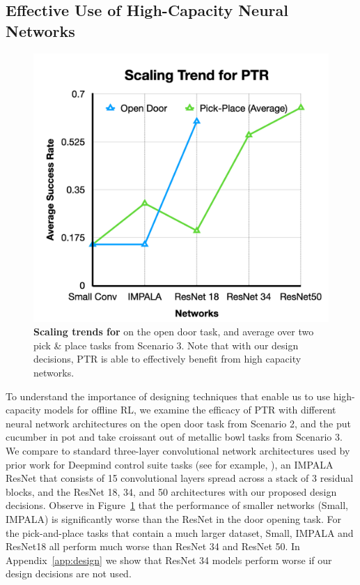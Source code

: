 \subsection{Effective Use of High-Capacity Neural Networks}

\begin{figure}
\centering
\vspace{-0.5cm}
\includegraphics[width=0.98\linewidth]{chapters/ptr/scaling_ptr.pdf}
\vspace{-0.4cm}
\caption{\footnotesize{\label{fig:scaling_ptr} \textbf{Scaling trends for \ptrmethodname} on the open door task, and average over two pick \& place tasks from Scenario 3. Note that with our design decisions, PTR is able to effectively benefit from high capacity networks.}}
\vspace{-0.6cm}
\end{figure}
To understand the importance of designing techniques that enable us to use high-capacity models for offline RL, we examine the efficacy of PTR with different neural network architectures on the open door task from Scenario 2, and the put cucumber in pot and take croissant out of metallic bowl tasks from Scenario 3. We compare to standard three-layer convolutional network architectures used by prior work for Deepmind control suite tasks (see for example, \citet{kostrikov2020image}), an IMPALA~\citep{espeholt2018impala} ResNet that consists of 15 convolutional layers spread across a stack of 3 residual blocks, and the ResNet 18, 34, and 50 architectures with our proposed design decisions. Observe in Figure~\ref{fig:scaling_ptr} that the performance of smaller networks (Small, IMPALA) is significantly worse than the ResNet in the door opening task. For the pick-and-place tasks that contain a much larger dataset, Small, IMPALA and ResNet18 all perform much worse than ResNet 34 and ResNet 50. In Appendix~\ref{app:design} we show that ResNet 34 models perform worse if our design decisions are not used. 


